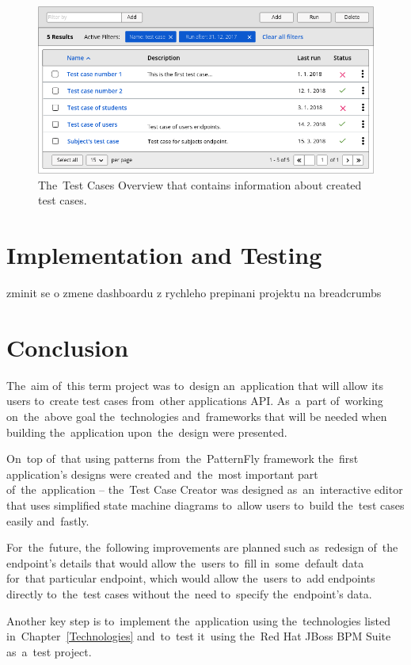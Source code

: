 \begin{figure}[!hbt]
	\centering
	\includegraphics[scale=0.4]{./designs/drafts-1.0/test-cases.png}
	\caption{The~Test Cases Overview that contains information about created test
	cases.}
	\label{test-cases}
\end{figure}




\chapter{Implementation and Testing}
zminit se o zmene dashboardu z rychleho prepinani projektu na breadcrumbs


\chapter{Conclusion}
The~aim of~this term project was to~design an~application that will allow its
users to~create test cases from~other applications API. As~a~part of~working
on~the~above goal the~technologies and~frameworks that will be needed when
building the~application upon~the~design were presented.

On~top of~that using patterns from~the~PatternFly framework the~first
application's designs were created and~the~most important part
of~the~application -- the~Test Case Creator was designed as~an~interactive
editor that uses simplified state machine diagrams to~allow users to~build the~test
cases easily and~fastly.

For~the~future, the~following improvements are planned such as~redesign of~the
endpoint's details that would allow the~users to~fill in~some~default data
for~that particular endpoint, which would allow the~users to~add endpoints
directly to~the~test cases without the~need to~specify the~endpoint's data.

Another key step is to~implement the~application using the~technologies listed
in~Chapter~\ref{Technologies} and~to~test it~using the~Red Hat JBoss BPM Suite
as~a~test project.




